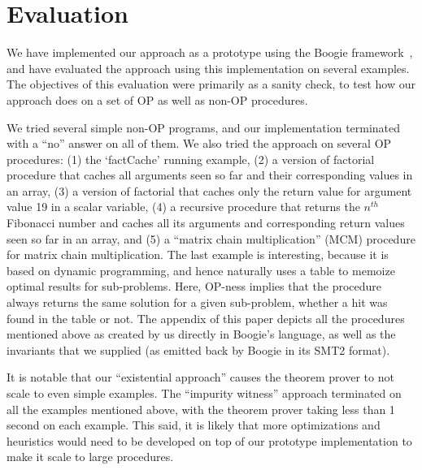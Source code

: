 \section{Evaluation}\label{sec:experiments}

We have implemented our approach as a prototype using the Boogie
framework~\cite{leino2008boogie}, and have evaluated the approach using
this implementation on several examples. The objectives of this evaluation
were primarily as a sanity check, to test how our approach does on a set of
OP as well as non-OP procedures.

We tried several simple non-OP programs, and our implementation terminated
with a ``no'' answer on all of them.  We also tried the approach on several
OP procedures: (1) the `factCache' running example, (2) a version of
factorial procedure that caches all arguments seen so far and their
corresponding values in an array, (3) a version of factorial that caches
only the return value for argument value 19 in a scalar variable, (4) a
recursive procedure that returns the $n^\mathit{th}$ Fibonacci number and
caches all its arguments and corresponding return values seen so far in an
array, and (5) a ``matrix chain multiplication'' (MCM) procedure for matrix
chain multiplication. The last example is interesting, because it is based
on dynamic programming, and hence naturally uses a table to memoize optimal
results for sub-problems. Here, OP-ness implies that the procedure always
returns the same solution for a given sub-problem, whether a hit was found
in the table or not.  The appendix of this paper depicts all the procedures
mentioned above as created by us directly in Boogie's language, as well as
the invariants that we supplied (as emitted back by Boogie in its SMT2
format).


It is notable that our ``existential approach'' causes the theorem prover
to not scale to even simple examples. The ``impurity witness'' approach
terminated on all the examples mentioned above, with the theorem prover
taking less than 1 second on each example. This said, it is likely that
more optimizations and heuristics would need to be developed on top of our
prototype implementation to make it scale to large procedures.

